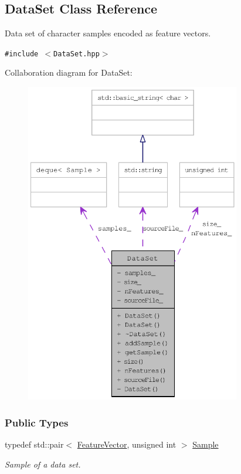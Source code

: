 \hypertarget{class_data_set}{
\subsection{DataSet Class Reference}
\label{class_data_set}
}
Data set of character samples encoded as feature vectors.  


{\tt \#include $<$DataSet.hpp$>$}

Collaboration diagram for DataSet:\nopagebreak
\begin{figure}[H]
\begin{center}
\leavevmode
\includegraphics[height=400pt]{class_data_set__coll__graph}
\end{center}
\end{figure}
\subsubsection*{Public Types}
\begin{CompactItemize}
\item 
typedef std::pair$<$ \hyperlink{class_feature_vector}{FeatureVector}, unsigned int $>$ \hyperlink{class_data_set_7563096ce4847d88411ed3f6ad331310}{Sample}
\begin{CompactList}\small\item\em Sample of a data set. \item\end{CompactList}\end{CompactItemize}
